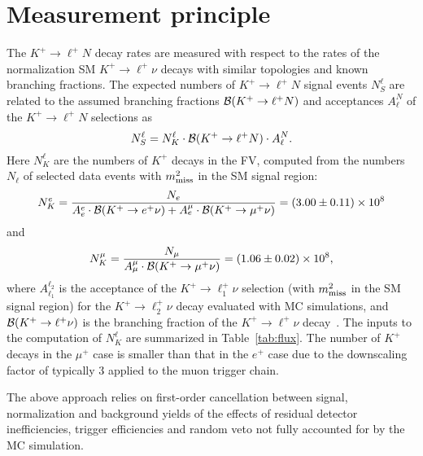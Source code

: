 \documentclass[11pt]{article}
\begin{document}

\section{Measurement principle}
\label{sec:flux}

The $K^+\to\ell^+N$ decay rates are measured with respect to the rates of the normalization SM $K^+\to\ell^+\nu$ decays with similar topologies and known branching fractions. The expected numbers of $K^+\to\ell^+N$ signal events $N_S^\ell$ are related to the assumed branching fractions ${\cal B}(K^+\to\ell^+N)$ and acceptances $A_\ell^N$ of the $K^+\to\ell^+N$ selections as
\begin{equation}
N_S^\ell= N_K^\ell \cdot {\cal B}(K^+\to\ell^+N) \cdot A_\ell^N.
\label{eq:master}
\end{equation}
Here $N_K^\ell$ are the numbers of $K^+$ decays in the FV, computed from the numbers $N_\ell$ of selected data events with $m_{\rm miss}^2$ in the SM signal region:
\begin{displaymath}
N_K^e = \frac{N_e}{ A_e^e \cdot {\cal B}(K^+\to e^+\nu) + A_e^\mu \cdot {\cal B}(K^+\to\mu^+\nu)} = (3.00\pm0.11)\times 10^8
\end{displaymath}
and
\begin{displaymath}
N_K^\mu = \frac{N_\mu}{A_\mu^\mu \cdot {\cal B}(K^+\to\mu^+\nu)} = (1.06\pm0.02)\times 10^8,
\end{displaymath}
where $A_{\ell_1}^{\ell_2}$ is the acceptance of the $K^+\to\ell_1^+\nu$ selection (with $m_{\rm miss}^2$ in the SM signal region) for the $K^+\to\ell_2^+\nu$ decay evaluated with MC simulations, and ${\cal B}(K^+\to\ell^+\nu)$ is the branching fraction of the $K^+\to\ell^+\nu$ decay~\cite{pdg}. The inputs to the computation of $N_K^\ell$ are summarized in Table~\ref{tab:flux}. The number of $K^+$ decays in the $\mu^+$ case is smaller than that in the $e^+$ case due to the downscaling factor of typically 3 applied to the muon trigger chain.

The above approach relies on first-order cancellation between signal, normalization and background yields of the effects of residual detector inefficiencies, trigger efficiencies and random veto not fully accounted for by the MC simulation.

\end{document}
